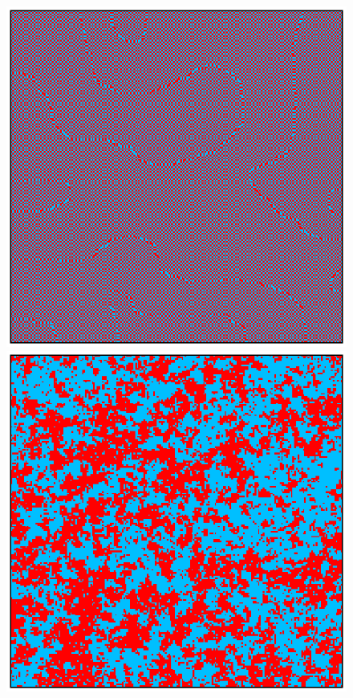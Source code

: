 \begin{figure}[h]
    \begin{minipage}[c]{0.32\textwidth}
        \centering
        \includegraphics[scale=0.38]{./images/ising/T_001_antiferro.eps}
    \end{minipage}
    \hfill
    \begin{minipage}[c]{0.32\textwidth}
        \centering
        \includegraphics[scale=0.38]{./images/ising/T_n065_antiferro.eps}

\end{minipage}
\end{figure}
